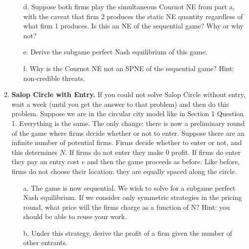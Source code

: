 \documentclass{article}
\begin{document}
\begin{enumerate}
\begin{enumerate}
        \vspace{2cm}
        
        \item[d.] Suppose both firms play the simultaneous Cournot NE from part a, with the caveat that firm 2 produces the static NE quantity regardless of what firm 1 produces. Is this an NE of the sequential game? Why or why not?
        
        \vspace{4cm}
        
        \item[e.] Derive the subgame perfect Nash equilibrium of this game.
        
        \vspace{6cm}
        
        \item[f.] Why is the Cournot NE not an SPNE of the sequential game? Hint: non-credible threats.
        
        \vspace{4cm}
        
    \end{enumerate}
    
    \item \textbf{Salop Circle with Entry.} If you could not solve Salop Circle without entry, wait a week (until you get the answer to that problem) and then do this problem. Suppose we are in the circular city model like in Section 1 Question 1. Everything is the same. The only change: there is now a preliminary round of the game where firms decide whether or not to enter. Suppose there are an infinite number of potential firms. Firms decide whether to enter or not, and this determines $N$. If firms do not enter they make $0$ profit. If firms do enter they pay an entry cost $e$ and then the game proceeds as before. Like before, firms do not choose their location: they are equally spaced along the circle.
    \begin{enumerate}
        \item[a.] The game is now sequential. We wish to solve for a subgame perfect Nash equilibrium. If we consider only symmetric strategies in the pricing round, what price will the firms charge as a function of N? Hint: you should be able to reuse your work.
        
        \vspace{6cm}
        
        \item[b.] Under this strategy, derive the profit of a firm given the number of other entrants.
        

\end{enumerate}
\end{enumerate}
\end{document}
